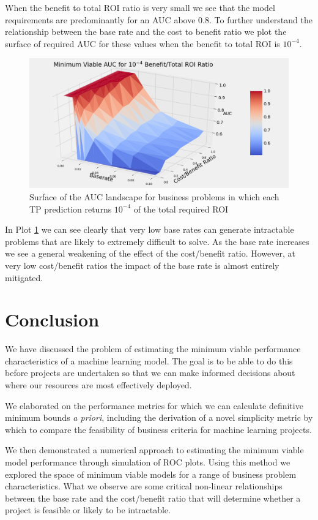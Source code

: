\documentclass[12pt,a4paper]{article}
\numberwithin{equation}{section}
\begin{document}
When the benefit to total ROI ratio is very small we see that the model requirements are predominantly
for an AUC above $0.8$. To further understand the relationship between the base rate and the cost to benefit ratio
we plot the surface of required AUC for these values when the benefit to total ROI is $10^{-4}$.

\begin{figure}[h!]
\includegraphics[scale=0.5]{images/Baserate_vs_Cost_to_Benefit.png}
\caption{Surface of the AUC landscape for business problems in which each TP prediction returns
$10^{-4}$ of the total required ROI}
\label{fig:CBRatio}
\end{figure}
 
In Plot \ref{fig:CBRatio} we can see clearly that very low base rates can generate intractable problems that
are likely to extremely difficult to solve. As the base rate increases we see a general weakening of the
effect of the cost/benefit ratio. However, at very low cost/benefit ratios the impact of the base rate
is almost entirely mitigated.

\section{Conclusion}

We have discussed the problem of estimating the minimum viable performance characteristics
of a machine learning model. The goal is to be able to do this before projects are
undertaken so that we can make informed decisions about where our resources are 
most effectively deployed.

We elaborated on the performance metrics for which we can calculate definitive minimum
bounds \textit{a priori}, including the derivation of a novel simplicity metric by which to compare the
feasibility of business criteria for machine learning projects. 

We then demonstrated a numerical approach to estimating the minimum viable model performance through simulation
of ROC plots.
Using this method we explored the space of minimum viable models for a range of business problem characteristics.
What we observe are some critical non-linear 
relationships between the base rate and the cost/benefit ratio that will determine whether a project 
is feasible or likely to be intractable.




\end{document}

